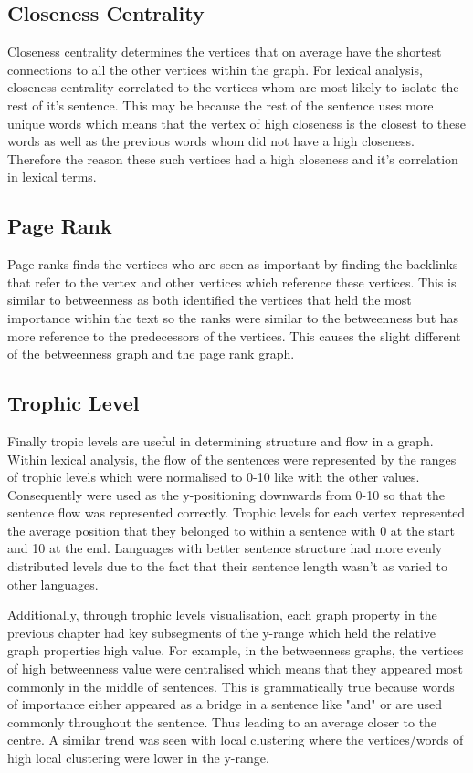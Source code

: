\subsection{Closeness Centrality}
Closeness centrality determines the vertices that on average have the shortest connections to all the other vertices within the graph. For lexical analysis, closeness centrality correlated to the vertices whom are most likely to isolate the rest of it's sentence. This may be because the rest of the sentence uses more unique words which means that the vertex of high closeness is the closest to these words as well as the previous words whom did not have a high closeness. Therefore the reason these such vertices had a high closeness and it's correlation in lexical terms.

\subsection{Page Rank}
Page ranks finds the vertices who are seen as important by finding the backlinks that refer to the vertex and other vertices which reference these vertices. This is similar to betweenness as both identified the vertices that held the most importance within the text so the ranks were similar to the betweenness but has more reference to the predecessors of the vertices. This causes the slight different of the betweenness graph and the page rank graph.

\subsection{Trophic Level}
Finally tropic levels are useful in determining structure and flow in a graph. Within lexical analysis, the flow of the sentences were represented by the ranges of trophic levels which were normalised to 0-10 like with the other values. Consequently were used as the y-positioning downwards from 0-10 so that the sentence flow was represented correctly. Trophic levels for each vertex represented the average position that they belonged to within a sentence with 0 at the start and 10 at the end. Languages with better sentence structure had more evenly distributed levels due to the fact that their sentence length wasn't as varied to other languages. 

Additionally, through trophic levels visualisation, each graph property in the previous chapter had key subsegments of the y-range which held the relative graph properties high value. For example, in the betweenness graphs, the vertices of high betweenness value were centralised which means that they appeared most commonly in the middle of sentences. This is grammatically true because words of importance either appeared as a bridge in a sentence like "and" or are used commonly throughout the sentence. Thus leading to an average closer to the centre. A similar trend was seen with local clustering where the vertices/words of high local clustering were lower in the y-range.
\\

